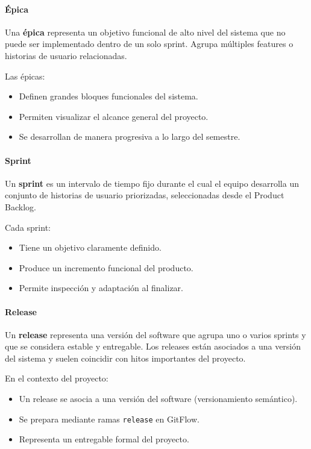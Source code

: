 \documentclass[12pt]{article}
\begin{document}
\paragraph{Épica}

Una \textbf{épica} representa un objetivo funcional de alto nivel del sistema que no puede ser implementado dentro de un solo sprint. Agrupa múltiples features o historias de usuario relacionadas.

Las épicas:
\begin{itemize}
    \item Definen grandes bloques funcionales del sistema.
    \item Permiten visualizar el alcance general del proyecto.
    \item Se desarrollan de manera progresiva a lo largo del semestre.
\end{itemize}

\paragraph{Sprint}

Un \textbf{sprint} es un intervalo de tiempo fijo durante el cual el equipo desarrolla un conjunto de historias de usuario priorizadas, seleccionadas desde el Product Backlog.

Cada sprint:
\begin{itemize}
    \item Tiene un objetivo claramente definido.
    \item Produce un incremento funcional del producto.
    \item Permite inspección y adaptación al finalizar.
\end{itemize}

\paragraph{Release}

Un \textbf{release} representa una versión del software que agrupa uno o varios sprints y que se considera estable y entregable. Los releases están asociados a una versión del sistema y suelen coincidir con hitos importantes del proyecto.

En el contexto del proyecto:
\begin{itemize}
    \item Un release se asocia a una versión del software (versionamiento semántico).
    \item Se prepara mediante ramas \texttt{release} en GitFlow.
    \item Representa un entregable formal del proyecto.
\end{itemize}
\end{document}
